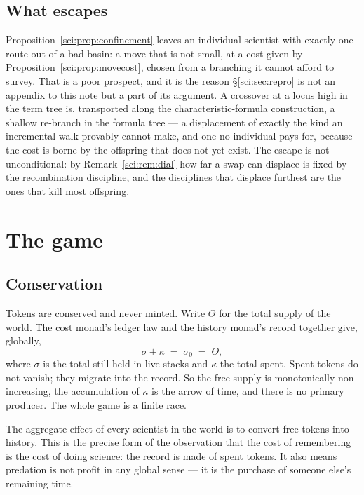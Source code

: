 \subsection{What escapes}\label{sci:S6.5}
\label{sci:sec:escape}

Proposition~\ref{sci:prop:confinement} leaves an individual scientist with exactly one route out of a bad
basin: a move that is not small, at a cost given by Proposition~\ref{sci:prop:movecost}, chosen from a
branching it cannot afford to survey. That is a poor prospect, and it is the reason
\S\ref{sci:sec:repro} is not an appendix to this note but a part of its argument. A crossover at a locus
high in the term tree is, transported along the characteristic-formula construction, a shallow
re-branch in the formula tree --- a displacement of exactly the kind an incremental walk provably
cannot make, and one no individual pays for, because the cost is borne by the offspring that does not
yet exist. The escape is not unconditional: by Remark~\ref{sci:rem:dial} how far a swap can displace is
fixed by the recombination discipline, and the disciplines that displace furthest are the ones that
kill most offspring.

\section{The game}\label{sci:S7}
\label{sci:sec:game}

\subsection{Conservation}\label{sci:S7.1}

Tokens are conserved and never minted. Write $\Theta$ for the total supply of the world. The cost
monad's ledger law and the history monad's record together give, globally,
\[
\sigma + \kappa \;=\; \sigma_0 \;=\; \Theta ,
\]
where $\sigma$ is the total still held in live stacks and $\kappa$ the total spent. Spent tokens do
not vanish; they migrate into the record. So the free supply is monotonically non-increasing, the
accumulation of $\kappa$ is the arrow of time, and there is no primary producer. The whole game is a
finite race.

\begin{remark}\label{sci:science-entropy-production}
The aggregate effect of every scientist in the world is to convert free tokens into history. This is
the precise form of the observation that the cost of remembering is the cost of doing science: the
record is made of spent tokens. It also means predation is not profit in any global sense --- it is
the purchase of someone else's remaining time.
\end{remark}


